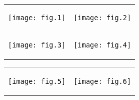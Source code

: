 \documentclass[a4paper,landscape]{article}
\begin{document}
\thispagestyle{empty}
\begin{tabular}{ c c } %
\begin{minipage}[t]{.5\textwidth}
    \begin{center}
    \texttt{[image: fig.1]}
    \end{center}
    \bigskip
\end{minipage}&
\begin{minipage}[t]{.5\textwidth}
    \begin{center}\texttt{[image: fig.2]}\end{center}
    \bigskip
\end{minipage}\\ %
\begin{minipage}[t]{.5\textwidth}
    \bigskip
    \begin{center}\texttt{[image: fig.3]}\end{center}
\end{minipage}&
\begin{minipage}[t]{.5\textwidth}
    \bigskip
    \begin{center}\texttt{[image: fig.4]}\end{center}
\end{minipage}\\ %
\end{tabular}
\newpage

\thispagestyle{empty}
\begin{tabular}{ c c } %
\begin{minipage}[t]{.5\textwidth}
    \bigskip
    \begin{center}\texttt{[image: fig.5]}\end{center}
\end{minipage}&
\begin{minipage}[t]{.5\textwidth}
    \bigskip
    \begin{center}\texttt{[image: fig.6]}\end{center}
\end{minipage}\\ %
\end{tabular}
\end{document}
